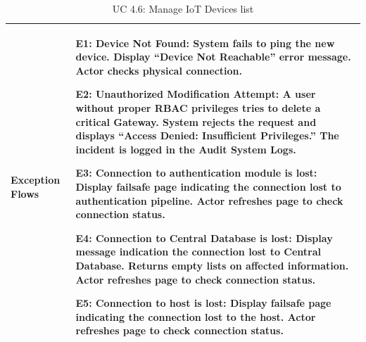\begin{table}[H]
\begin{tabularx}{\textwidth}{|>{\raggedright\arraybackslash}p{3.5cm}|>{\RaggedRight\arraybackslash}X|}
\hline
Exception Flows & 
\textbf{E1: Device Not Found:} System fails to ping the new device. Display ``Device Not Reachable'' error message. Actor checks physical connection. \par \vspace{0.5em}
\textbf{E2: Unauthorized Modification Attempt:} A user without proper RBAC privileges tries to delete a critical Gateway. System rejects the request and displays ``Access Denied: Insufficient Privileges.'' The incident is logged in the Audit System Logs. \par \vspace{0.5em}
\textbf{E3: Connection to authentication module is lost:} Display failsafe page indicating the connection lost to authentication pipeline. Actor refreshes page to check connection status. \par \vspace{0.5em}
\textbf{E4: Connection to Central Database is lost:} Display message indication the connection lost to Central Database. Returns empty lists on affected information. Actor refreshes page to check connection status. \par \vspace{0.5em}
\textbf{E5: Connection to host is lost:} Display failsafe page indicating the connection lost to the host. Actor refreshes page to check connection status. \\
\hline
\end{tabularx}
\caption{UC 4.6: Manage IoT Devices list}
\label{tab:uc4.6}
\end{table}
